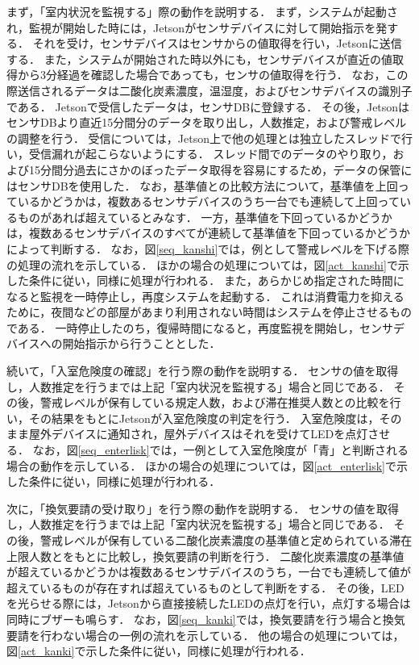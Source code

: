 まず，「室内状況を監視する」際の動作を説明する．
まず，システムが起動され，監視が開始した時には，Jetsonがセンサデバイスに対して開始指示を発する．
それを受け，センサデバイスはセンサからの値取得を行い，Jetsonに送信する．
また，システムが開始された時以外にも，センサデバイスが直近の値取得から3分経過を確認した場合であっても，センサの値取得を行う．
なお，この際送信されるデータは二酸化炭素濃度，温湿度，およびセンサデバイスの識別子である．
Jetsonで受信したデータは，センサDBに登録する．
その後，JetsonはセンサDBより直近15分間分のデータを取り出し，人数推定，および警戒レベルの調整を行う．
受信については，Jetson上で他の処理とは独立したスレッドで行い，受信漏れが起こらないようにする．
スレッド間でのデータのやり取り，および15分間分過去にさかのぼったデータ取得を容易にするため，データの保管にはセンサDBを使用した．
なお，基準値との比較方法について，基準値を上回っているかどうかは，複数あるセンサデバイスのうち一台でも連続して上回っているものがあれば超えているとみなす．
一方，基準値を下回っているかどうかは，複数あるセンサデバイスのすべてが連続して基準値を下回っているかどうかによって判断する．
なお，図\ref{seq_kanshi}では，例として警戒レベルを下げる際の処理の流れを示している．
ほかの場合の処理については，図\ref{act_kanshi}で示した条件に従い，同様に処理が行われる．
また，あらかじめ指定された時間になると監視を一時停止し，再度システムを起動する．
これは消費電力を抑えるために，夜間などの部屋があまり利用されない時間はシステムを停止させるものである．
一時停止したのち，復帰時間になると，再度監視を開始し，センサデバイスへの開始指示から行うこととした．

続いて，「入室危険度の確認」を行う際の動作を説明する．
センサの値を取得し，人数推定を行うまでは上記「室内状況を監視する」場合と同じである．
その後，警戒レベルが保有している規定人数，および滞在推奨人数との比較を行い，その結果をもとにJetsonが入室危険度の判定を行う．
入室危険度は，そのまま屋外デバイスに通知され，屋外デバイスはそれを受けてLEDを点灯させる．
なお，図\ref{seq_enterlisk}では，一例として入室危険度が「青」と判断される場合の動作を示している．
ほかの場合の処理については，図\ref{act_enterlisk}で示した条件に従い，同様に処理が行われる．

次に，「換気要請の受け取り」を行う際の動作を説明する．
センサの値を取得し，人数推定を行うまでは上記「室内状況を監視する」場合と同じである．
その後，警戒レベルが保有している二酸化炭素濃度の基準値と定められている滞在上限人数とをもとに比較し，換気要請の判断を行う．
二酸化炭素濃度の基準値が超えているかどうかは複数あるセンサデバイスのうち，一台でも連続して値が超えているものが存在すれば超えているものとして判断をする．
その後，LEDを光らせる際には，Jetsonから直接接続したLEDの点灯を行い，点灯する場合は同時にブザーも鳴らす．
なお，図\ref{seq_kanki}では，換気要請を行う場合と換気要請を行わない場合の一例の流れを示している．
他の場合の処理については，図\ref{act_kanki}で示した条件に従い，同様に処理が行われる．

